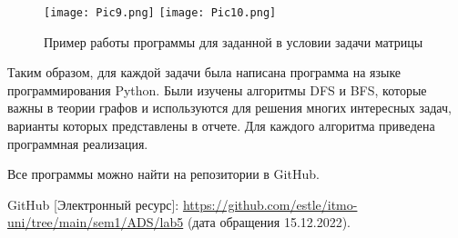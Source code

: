 \documentclass[14pt]{extreport}
\begin{document}
\begin{figure}[H]
\texttt{[image: Pic9.png]}
\texttt{[image: Pic10.png]}
\caption{Пример работы программы для заданной в условии задачи матрицы}
\label{fig20}
\end{figure}

\conclusions

Таким образом, для каждой задачи была написана программа на языке программирования Python. Были изучены алгоритмы DFS и BFS, которые важны в теории графов и используются для решения многих интересных задач, варианты которых представлены в отчете. Для каждого алгоритма приведена программная реализация.

Все программы можно найти на репозитории в GitHub\cite{bib1}.

\newpage
\begin{thebibliography}{99}

GitHub [Электронный ресурс]: \url{https://github.com/estle/itmo-uni/tree/main/sem1/ADS/lab5} (дата обращения 15.12.2022).

\end{thebibliography}
\end{document}
